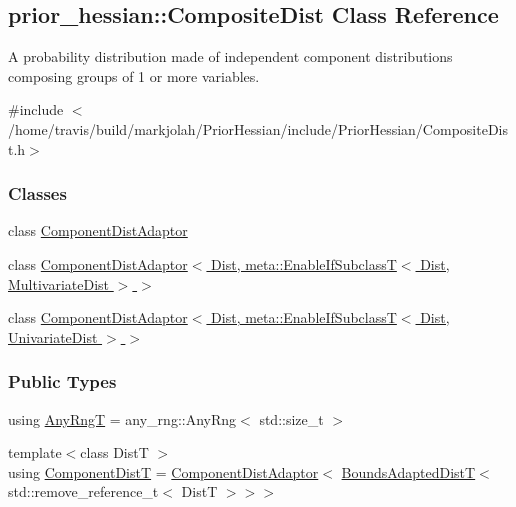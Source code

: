 \hypertarget{classprior__hessian_1_1CompositeDist}{}\subsection{prior\+\_\+hessian\+:\+:Composite\+Dist Class Reference}
\label{classprior__hessian_1_1CompositeDist}


A probability distribution made of independent component distributions composing groups of 1 or more variables.  




{\ttfamily \#include $<$/home/travis/build/markjolah/\+Prior\+Hessian/include/\+Prior\+Hessian/\+Composite\+Dist.\+h$>$}

\subsubsection*{Classes}
\begin{DoxyCompactItemize}
\item 
class \hyperlink{classprior__hessian_1_1CompositeDist_classprior__hessian_1_1CompositeDist_1_1ComponentDistAdaptor}{Component\+Dist\+Adaptor}
\item 
class \hyperlink{classprior__hessian_1_1CompositeDist_1_1ComponentDistAdaptor_3_01Dist_00_01meta_1_1EnableIfSubcld67d34d533dbae21b9dad35557546eec}{Component\+Dist\+Adaptor$<$ Dist, meta\+::\+Enable\+If\+Subclass\+T$<$ Dist, Multivariate\+Dist $>$ $>$}
\item 
class \hyperlink{classprior__hessian_1_1CompositeDist_1_1ComponentDistAdaptor_3_01Dist_00_01meta_1_1EnableIfSubclc6c9bd83bba546a81e521c87ad7ee6d3}{Component\+Dist\+Adaptor$<$ Dist, meta\+::\+Enable\+If\+Subclass\+T$<$ Dist, Univariate\+Dist $>$ $>$}
\end{DoxyCompactItemize}
\subsubsection*{Public Types}
\begin{DoxyCompactItemize}
\item 
using \hyperlink{classprior__hessian_1_1CompositeDist_aa770eb02f04ec95a1e32044bb071281b}{Any\+RngT} = any\+\_\+rng\+::\+Any\+Rng$<$ std\+::size\+\_\+t $>$
\item 
{\footnotesize template$<$class DistT $>$ }\\using \hyperlink{classprior__hessian_1_1CompositeDist_ab9b58a9ef851c7d5453273785d915c34}{Component\+DistT} = \hyperlink{classprior__hessian_1_1CompositeDist_classprior__hessian_1_1CompositeDist_1_1ComponentDistAdaptor}{Component\+Dist\+Adaptor}$<$ \hyperlink{namespaceprior__hessian_a919f0d7f51ea845224ca7f03983508a9}{Bounds\+Adapted\+DistT}$<$ std\+::remove\+\_\+reference\+\_\+t$<$ DistT $>$$>$$>$
\end{DoxyCompactItemize}
